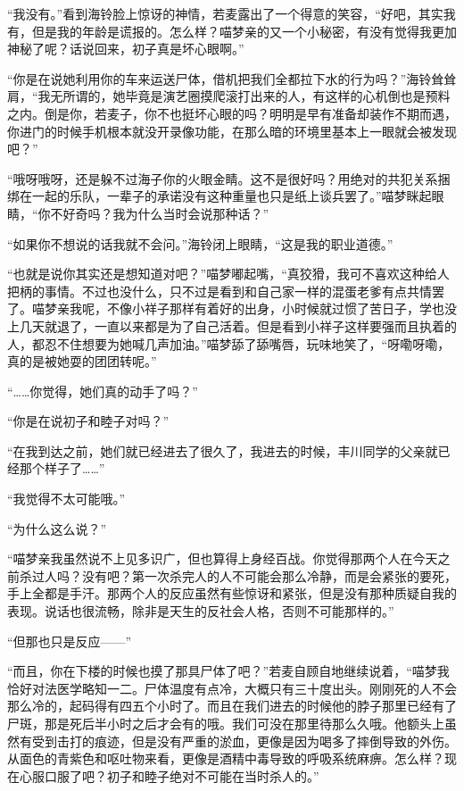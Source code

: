 \documentclass{article}
\begin{document}
“我没有。”看到海铃脸上惊讶的神情，若麦露出了一个得意的笑容，“好吧，其实我有，但是我的年龄是谎报的。怎么样？喵梦亲的又一个小秘密，有没有觉得我更加神秘了呢？话说回来，初子真是坏心眼啊。”



“你是在说她利用你的车来运送尸体，借机把我们全都拉下水的行为吗？”海铃耸耸肩，“我无所谓的，她毕竟是演艺圈摸爬滚打出来的人，有这样的心机倒也是预料之内。倒是你，若麦子，你不也挺坏心眼的吗？明明是早有准备却装作不期而遇，你进门的时候手机根本就没开录像功能，在那么暗的环境里基本上一眼就会被发现吧？”



“哦呀哦呀，还是躲不过海子你的火眼金睛。这不是很好吗？用绝对的共犯关系捆绑在一起的乐队，一辈子的承诺没有这种重量也只是纸上谈兵罢了。”喵梦眯起眼睛，“你不好奇吗？我为什么当时会说那种话？”



“如果你不想说的话我就不会问。”海铃闭上眼睛，“这是我的职业道德。”



“也就是说你其实还是想知道对吧？”喵梦嘟起嘴，“真狡猾，我可不喜欢这种给人把柄的事情。不过也没什么，只不过是看到和自己家一样的混蛋老爹有点共情罢了。喵梦亲我呢，不像小祥子那样有着好的出身，小时候就过惯了苦日子，学也没上几天就退了，一直以来都是为了自己活着。但是看到小祥子这样要强而且执着的人，都忍不住想要为她喊几声加油。”喵梦舔了舔嘴唇，玩味地笑了，“呀嘞呀嘞，真的是被她耍的团团转呢。”



“……你觉得，她们真的动手了吗？”



“你是在说初子和睦子对吗？”



“在我到达之前，她们就已经进去了很久了，我进去的时候，丰川同学的父亲就已经那个样子了……”



“我觉得不太可能哦。”



“为什么这么说？”



“喵梦亲我虽然说不上见多识广，但也算得上身经百战。你觉得那两个人在今天之前杀过人吗？没有吧？第一次杀完人的人不可能会那么冷静，而是会紧张的要死，手上全都是手汗。那两个人的反应虽然有些惊讶和紧张，但是没有那种质疑自我的表现。说话也很流畅，除非是天生的反社会人格，否则不可能那样的。”



“但那也只是反应——”



“而且，你在下楼的时候也摸了那具尸体了吧？”若麦自顾自地继续说着，“喵梦我恰好对法医学略知一二。尸体温度有点冷，大概只有三十度出头。刚刚死的人不会那么冷的，起码得有四五个小时了。而且在我们进去的时候他的脖子那里已经有了尸斑，那是死后半小时之后才会有的哦。我们可没在那里待那么久哦。他额头上虽然有受到击打的痕迹，但是没有严重的淤血，更像是因为喝多了摔倒导致的外伤。从面色的青紫色和呕吐物来看，更像是酒精中毒导致的呼吸系统麻痹。怎么样？现在心服口服了吧？初子和睦子绝对不可能在当时杀人的。”
\end{document}
